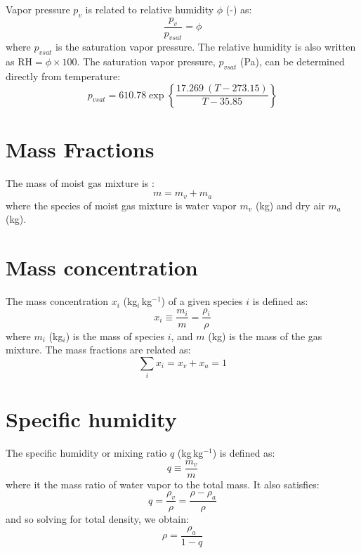 Vapor pressure $p_v$ is related to relative humidity $\phi$ (-) as:
\begin{equation}
\frac{p_v}{p_{\textit{vsat}}} = \phi
\end{equation}
where $p_{\textit{vsat}}$ is the saturation vapor pressure. The relative humidity is also written as $\textrm{RH}=\phi\times 100$. The saturation vapor pressure, $p_{\textit{vsat}}$ (Pa), can be determined directly from temperature:
\begin{equation}
p_{vsat} = 610.78 \exp \left\{\frac{17.269\ (T - 273.15)}{T - 35.85}\right\}
\end{equation}

\section*{Mass Fractions}

The mass of moist gas mixture is :
\begin{equation}
m = m_v + m_a
\end{equation}
where the species of moist gas mixture is water vapor $m_v$ (kg) and dry air $m_a$ (kg).

\section*{Mass concentration}

The mass concentration $x_i$ (kg$_i$\,kg$^{-1}$) of a given species $i$ is defined as:
\begin{equation}
x_i \equiv \frac{m_i}{m} = \frac{\rho_i}{\rho}
\end{equation}
where $m_i$ (kg$_i$) is the mass of species $i$, and $m$ (kg) is the mass of the gas mixture. The mass fractions are related as:
\begin{equation}
\sum_i x_i = x_v + x_a = 1
\label{eq:totalconc}
\end{equation}

\section*{Specific humidity}

The specific humidity or mixing ratio $q$ (kg\,kg$^{-1}$) is defined as:
\begin{equation}
q \equiv \frac{m_v}{m}
\label{eq:def_q}
\end{equation}
where it the mass ratio of water vapor to the total mass. It also satisfies:
\begin{equation}
q = \frac{\rho_v}{\rho} = \frac{\rho - \rho_a}{\rho}
\label{eq:q_rho}
\end{equation}
and so solving for total density, we obtain:
\begin{equation}
\rho = \frac{\rho_a}{1-q}
\label{eq:q_rho2}
\end{equation}


